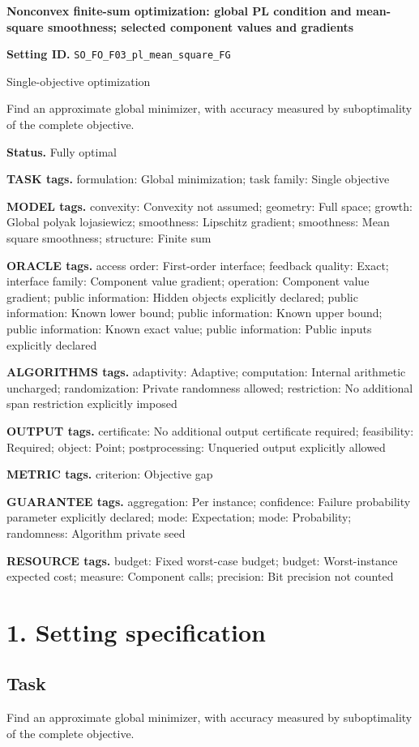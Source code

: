 \documentclass[10pt,a4paper]{article}
\begin{document}
\raggedright

{\LARGE\bfseries\sffamily\color{AtlasNavy} Nonconvex finite-sum optimization: global PL condition and mean-square smoothness; selected component values and gradients\par}\vspace{5pt}
\textbf{Setting ID.} \texttt{SO\_\allowbreak{}FO\_\allowbreak{}F03\_\allowbreak{}pl\_\allowbreak{}mean\_\allowbreak{}square\_\allowbreak{}FG}

Single-objective optimization

Find an approximate global minimizer, with accuracy measured by suboptimality of the complete objective.

\textbf{Status.} Fully optimal

\textbf{TASK tags.} formulation: Global minimization; task family: Single objective

\textbf{MODEL tags.} convexity: Convexity not assumed; geometry: Full space; growth: Global polyak lojasiewicz; smoothness: Lipschitz gradient; smoothness: Mean square smoothness; structure: Finite sum

\textbf{ORACLE tags.} access order: First-order interface; feedback quality: Exact; interface family: Component value gradient; operation: Component value gradient; public information: Hidden objects explicitly declared; public information: Known lower bound; public information: Known upper bound; public information: Known exact value; public information: Public inputs explicitly declared

\textbf{ALGORITHMS tags.} adaptivity: Adaptive; computation: Internal arithmetic uncharged; randomization: Private randomness allowed; restriction: No additional span restriction explicitly imposed

\textbf{OUTPUT tags.} certificate: No additional output certificate required; feasibility: Required; object: Point; postprocessing: Unqueried output explicitly allowed

\textbf{METRIC tags.} criterion: Objective gap

\textbf{GUARANTEE tags.} aggregation: Per instance; confidence: Failure probability parameter explicitly declared; mode: Expectation; mode: Probability; randomness: Algorithm private seed

\textbf{RESOURCE tags.} budget: Fixed worst-case budget; budget: Worst-instance expected cost; measure: Component calls; precision: Bit precision not counted

\section{1. Setting specification}
\subsection{Task}
Find an approximate global minimizer, with accuracy measured by suboptimality of the complete objective.
\end{document}
